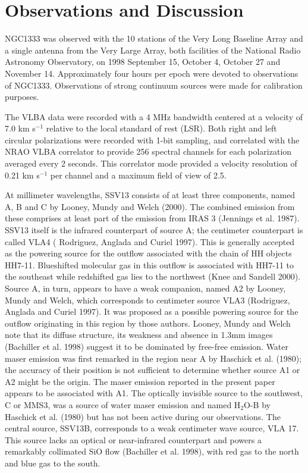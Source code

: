 \section{Observations and Discussion}

NGC1333 was observed with the 10 stations of the Very Long Baseline Array and a single antenna from the Very Large Array, both facilities of the National Radio Astronomy Observatory, on 1998 September 15, October 4, October 27 and November 14. Approximately four hours per epoch were devoted to observations of NGC1333.  Observations of strong continuum sources were made for calibration purposes.

The VLBA data were recorded with a 4 MHz bandwidth centered at a velocity of 7.0 km s$^{-1}$ relative to the local standard of rest (LSR).  Both right and left circular polarizations were recorded with 1-bit sampling, and correlated with the NRAO VLBA correlator to provide 256 spectral channels for each polarization averaged every 2 seconds.  This correlator mode provided a velocity resolution of 0.21 km s$^{-1}$ per channel and a maximum field of  view of 2.5\arcsec. 

	At millimeter wavelengths, SSV13 consists of at least three components, named A, B and C by Looney, Mundy and Welch (2000).  The combined emission from these comprises at least part of
the emission from IRAS 3 (Jennings et al. 1987).  SSV13 itself is the infrared counterpart of source A; the centimeter counterpart is called VLA4 ( Rodriguez, Anglada and Curiel 1997).  This is generally accepted as the powering source for the outflow associated with the chain of HH objects HH7-11.  Blueshifted molecular gas in this outflow is associated with HH7-11 to the southeast while redshifted gas lies to the northwest (Knee and Sandell 2000). Source A, in turn, appears to  have a weak companion, named A2 by Looney, Mundy and Welch, which corresponds to centimeter source VLA3 (Rodriguez, Anglada and Curiel 1997).  It was proposed as a possible powering source for the outflow originating in this region by those authors. Looney, Mundy and Welch note  that its diffuse structure, its weakness and absence in 1.3mm images  (Bachiller et al. 1998) suggest it to be dominated by free-free emission. Water maser emission was first remarked in the region near A by Haschick et al. (1980); the accuracy of their position is not sufficient to determine whether source A1 or A2 might be the origin. The maser emission reported in the present paper appears to be associated with A1. The optically invisible source to the southwest, C or MMS3, was a source of water maser emission and named H$_2$O-B by Haschick et al. (1980) but has not been active during our observations. The central source, SSV13B, corresponds to a weak centimeter wave source, VLA 17.  This source lacks an optical or near-infrared counterpart and powers a remarkably collimated SiO flow (Bachiller et al. 1998), with red gas to the north and blue gas to the south.

